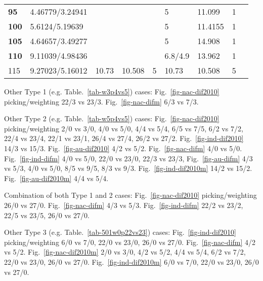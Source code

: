 \begin{table*}
\begin{tabular}{|l|l|l|l|l|l|l|l|l|l}
\textbf{95} & 4.46779/3.24941 & \multicolumn{3}{l|}{} & 5 & 11.099 & 1 & \multicolumn{2}{l|}{} \\ \cline{1-2} \cline{6-8}
\textbf{100} & 5.6124/5.19639 & \multicolumn{3}{l|}{} & 5 & 11.4155 & 1 & \multicolumn{2}{l|}{} \\ \cline{1-2} \cline{6-8}
\textbf{105} & 4.64657/3.49277 & \multicolumn{3}{l|}{} & 5 & 14.908 & 1 & \multicolumn{2}{l|}{} \\ \cline{1-2} \cline{6-8}
\textbf{110} & 9.11039/4.98436 & \multicolumn{3}{l|}{} & 6.8/4.9 & 13.962 & 1 & \multicolumn{2}{l|}{} \\ \cline{1-8}
115 & 9.27023/5.16012 & 10.73 & 10.508 & 5 & 10.73 & 10.508 & 5 & \multicolumn{2}{l|}{} \\ \cline{1-8}
\end{tabular}
\end{table*}

Other Type 1 (e.g. Table.~\ref{tab-w3p4vs5}) cases: Fig.~\ref{fig-nac-dif2010}
picking/weighting 22/3 vs 23/3. Fig.~\ref{fig-nac-difm} 6/3 vs 7/3.

Other Type 2 (e.g. Table.~\ref{tab-w5p4vs5}) cases: Fig.~\ref{fig-nac-dif2010}
picking/weighting 2/0 vs 3/0, 4/0 vs
5/0, 4/4 vs 5/4, 6/5 vs 7/5, 6/2 vs 7/2,
22/4 vs 23/4, 22/1 vs 23/1, 26/4 vs 27/4, 26/2 vs 27/2.
Fig.~\ref{fig-ind-dif2010} 14/3 vs 15/3. Fig.~\ref{fig-au-dif2010} 4/2 vs 5/2.
Fig.~\ref{fig-nac-difm} 4/0 vs 5/0.
Fig.~\ref{fig-ind-difm} 4/0 vs 5/0, 22/0 vs
23/0, 22/3 vs 23/3, Fig.~\ref{fig-au-difm}
4/3 vs 5/3, 4/0 vs 5/0, 8/5 vs 9/5, 8/3 vs 9/3. Fig.~\ref{fig-ind-dif2010m}
14/2 vs 15/2. Fig.~\ref{fig-au-dif2010m} 4/4 vs 5/4.

Combination of both Type 1 and 2 cases: Fig.~\ref{fig-nac-dif2010}
picking/weighting 26/0 vs 27/0. Fig.~\ref{fig-nac-difm}
4/3 vs 5/3. Fig.~\ref{fig-ind-difm} 22/2 vs 23/2, 22/5 vs 23/5, 26/0
vs 27/0.

Other Type 3 (e.g. Table.~\ref{tab-501w0p22vs23}) cases: Fig.~\ref{fig-ind-dif2010}
picking/weighting 6/0 vs 7/0, 22/0 vs
23/0, 26/0 vs 27/0. Fig.~\ref{fig-nac-difm}
4/2 vs 5/2. Fig.~\ref{fig-nac-dif2010m} 2/0
vs 3/0, 4/2 vs 5/2, 4/4 vs 5/4, 6/2 vs 7/2, 22/0 vs
23/0, 26/0 vs 27/0.
Fig.~\ref{fig-ind-dif2010m} 6/0 vs 7/0, 22/0
vs 23/0, 26/0 vs 27/0.

